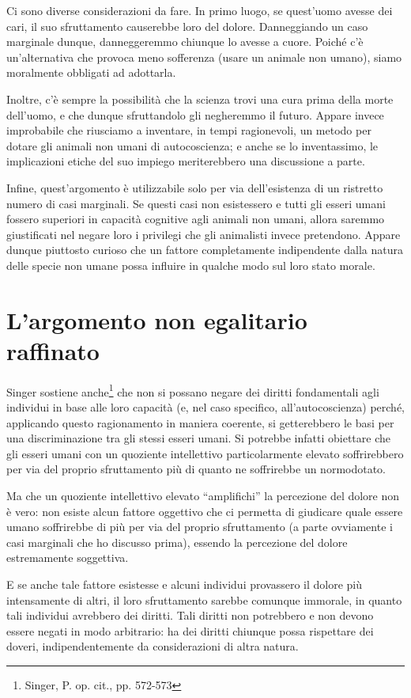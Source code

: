 Ci sono diverse considerazioni da fare. In primo luogo, se quest'uomo avesse dei cari, il suo
sfruttamento causerebbe loro del dolore. Danneggiando un caso marginale dunque, danneggeremmo
chiunque lo avesse a cuore. Poiché c'è un'alternativa che provoca meno sofferenza (usare un animale
non umano), siamo moralmente obbligati ad adottarla.

Inoltre, c'è sempre la possibilità che la scienza trovi una cura prima della morte dell'uomo, e che
dunque sfruttandolo gli negheremmo il futuro. Appare invece improbabile che riusciamo a inventare,
in tempi ragionevoli, un metodo per dotare gli animali non umani di autocoscienza; e anche se lo
inventassimo, le implicazioni etiche del suo impiego meriterebbero una discussione a parte.

Infine, quest'argomento è utilizzabile solo per via dell'esistenza di un ristretto numero di casi
marginali. Se questi casi non esistessero e tutti gli esseri umani fossero superiori in capacità
cognitive agli animali non umani, allora saremmo giustificati nel negare loro i privilegi che gli
animalisti invece pretendono. Appare dunque piuttosto curioso che un fattore completamente
indipendente dalla natura delle specie non umane possa influire in qualche modo sul loro stato
morale.

\section{L'argomento non egalitario raffinato}

Singer sostiene anche\footnote{Singer, P. op. cit., pp. 572-573} che non si possano negare dei
diritti fondamentali agli individui in base alle loro capacità (e, nel caso specifico,
all'autocoscienza) perché, applicando questo ragionamento in maniera coerente, si getterebbero le
basi per una discriminazione tra gli stessi esseri umani. Si potrebbe infatti obiettare che gli
esseri umani con un quoziente intellettivo particolarmente elevato soffrirebbero per via del proprio
sfruttamento più di quanto ne soffrirebbe un normodotato.

Ma che un quoziente intellettivo elevato ``amplifichi'' la percezione del dolore non è vero: non
esiste alcun fattore oggettivo che ci permetta di giudicare quale essere umano soffrirebbe di più
per via del proprio sfruttamento (a parte ovviamente i casi marginali che ho discusso prima),
essendo la percezione del dolore estremamente soggettiva.

E se anche tale fattore esistesse e alcuni individui provassero il dolore più intensamente di altri,
il loro sfruttamento sarebbe comunque immorale, in quanto tali individui avrebbero dei diritti. Tali
diritti non potrebbero e non devono essere negati in modo arbitrario: ha dei diritti chiunque possa
rispettare dei doveri, indipendentemente da considerazioni di altra natura.

